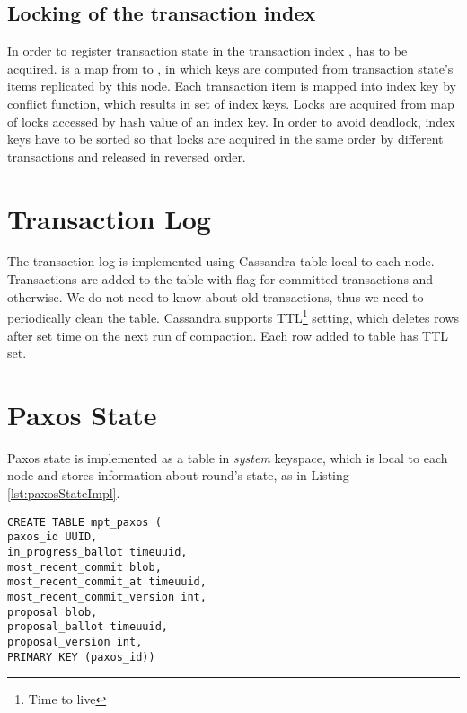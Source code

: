 \subsection{Locking of the transaction index}
In order to register transaction state \txState in the transaction index \txIndex, \txIndex has to be acquired.
\txIndex is a map from  to , in which keys are computed from transaction
state’s items replicated by this node. Each transaction item \txItem is mapped into index key by conflict function,
which results in set of index keys. Locks are acquired from map of locks accessed by hash value of an index key. In
order to avoid deadlock, index keys have to be sorted so that locks are acquired in the same order by different
transactions and released in reversed order.



\section{Transaction Log}
The transaction log \txLog is implemented using Cassandra table local to each node. 
Transactions are added to the table with flag  for committed transactions and  otherwise. We do not need to know about old transactions, thus we need to periodically clean the table. Cassandra supports TTL\footnote{Time to live} setting, which deletes rows after set time on the next run of compaction. Each row added to \txLog table has TTL set.


\section{Paxos State}
Paxos state is implemented as a table in \emph{system} keyspace, which is local to each node and stores information about \paxos round's state, as in Listing \ref{lst:paxosStateImpl}.

\begin{lstlisting}[style=outcode,label={lst:paxosStateImpl},caption={Table definition for multi partition transactions Paxos state}]
CREATE TABLE mpt_paxos (
paxos_id UUID,
in_progress_ballot timeuuid,
most_recent_commit blob,
most_recent_commit_at timeuuid,
most_recent_commit_version int,
proposal blob,
proposal_ballot timeuuid,
proposal_version int,
PRIMARY KEY (paxos_id))
\end{lstlisting}



